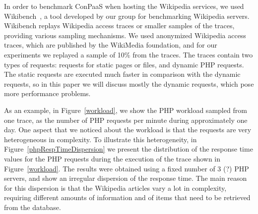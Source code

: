 In order to benchmark ConPaaS when hosting the Wikipedia services, we
used Wikibench~\cite{wikibench}, a tool developed by our group for 
benchmarking Wikipedia servers. Wikibench replays Wikipedia access
traces or smaller samples of the traces, providing various sampling
mechanisms. We used anonymized Wikipedia access traces, which are 
published by the WikiMedia foundation, and for our experiments we
replayed a sample of 10\% from the traces. The traces contain two 
types of requests: requests for static pages or files, and dynamic
PHP requests. The static requests are executed much faster in comparison
with the dynamic requests, so in this paper we will discuss mostly
the dynamic requests, which pose more performance problems.  



As an example, in Figure~\ref{workload}, we show the PHP workload 
sampled from one trace, as the number of PHP requests per minute 
during approximately one day. One aspect that we noticed about the 
workload is that the requests are very heterogeneous in complexity.
To illustrate this heterogeneity, in Figure~\ref{phpRespTimeDispersion}
we present the distribution of the response time values for the PHP 
requests during the execution of the trace shown in Figure~\ref{workload}.
The results were obtained using a fixed number of 3 (?) PHP servers,
and show an irregular dispersion of the response time. The main reason
for this dispersion is that the Wikipedia articles vary a lot in complexity,
requiring different amounts of information and of items that
need to be retrieved from the database. 


